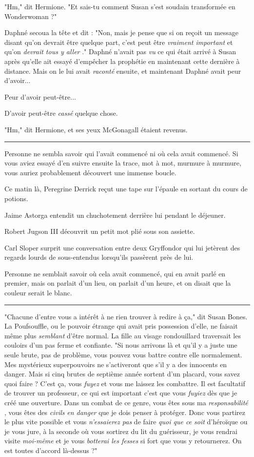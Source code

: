 "Hm," dit Hermione. "Et sais-tu comment Susan s'est soudain transformée en Wonderwoman ?"

Daphné secoua la tête et dit : "Non, mais je pense que si on reçoit un message disant qu'on devrait être quelque part, c'est peut être \emph{vraiment important}  et qu'on \emph{devrait tous y aller} ." Daphné n'avait pas \emph{vu}  ce qui était arrivé à Susan après qu'elle ait essayé d'empêcher la prophétie en maintenant cette dernière à distance. Mais on le lui avait \emph{raconté}  ensuite, et maintenant Daphné avait peur d'avoir...

Peur d'avoir peut-être...

D'avoir peut-être \emph{cassé } quelque chose.

"Hm," dit Hermione, et ses yeux McGonagall étaient revenus.
\par\noindent\rule{\textwidth}{0.4pt}
Personne ne sembla savoir qui l'avait commencé ni où cela avait commencé. Si vous aviez essayé d'en suivre ensuite la trace, mot à mot, murmure à murmure, vous auriez probablement découvert une immense boucle.

Ce matin là, Peregrine Derrick reçut une tape sur l'épaule en sortant du cours de potions.

Jaime Astorga entendit un chuchotement derrière lui pendant le déjeuner.

Robert Jugson III découvrit un petit mot plié sous son assiette.

Carl Sloper surprit une conversation entre deux Gryffondor qui lui jetèrent des regards lourds de sous-entendus lorsqu'ils passèrent près de lui.

Personne ne semblait savoir où cela avait commencé, qui en avait parlé en premier, mais on parlait d'un lieu, on parlait d'un heure, et on disait que la couleur serait le blanc.
\par\noindent\rule{\textwidth}{0.4pt}
"Chacune d'entre vous a intérêt à ne rien trouver à redire à ça," dit Susan Bones. La Poufsouffle, ou le pouvoir étrange qui avait pris possession d'elle, ne faisait même plus \emph{semblant}  d'être normal. La fille au visage rondouillard traversait les couloirs d'un pas ferme et confiante. "Si nous arrivons là et qu'il y a juste une seule brute, pas de problème, vous pouvez vous battre contre elle normalement. Mes mystérieux superpouvoirs ne s'activeront que s'il y a des innocents en danger. Mais si cinq brutes de septième année sortent d'un placard, vous savez quoi faire ? C'est ça, vous \emph{fuyez}  et vous me laissez les combattre. Il est facultatif de trouver un professeur, ce qui est important c'est que vous \emph{fuyiez}  dès que je créé une ouverture. Dans un combat de ce genre, vous êtes sous ma \emph{responsabilité} , vous êtes des \emph{civils}  \emph{en danger}  que je dois penser à protéger. Donc vous partirez le plus vite possible et vous \emph{n'essaierez pas}  de faire \emph{quoi que ce soit}  d'héroïque ou je vous jure, à la seconde où vous sortirez du lit du guérisseur, je vous rendrai visite \emph{moi-même}  et je vous \emph{botterai les fesses } si fort que vous y retournerez. On est toutes d'accord là-dessus ?"

